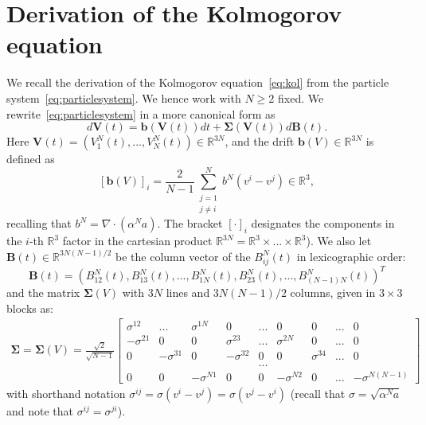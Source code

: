 \documentclass[11pt,a4paper]{article}
\theoremstyle{definition}
\theoremstyle{plain}
\newcommand{\bd}[1]{\mathbf{#1}}
\begin{document}
\section{Derivation of the Kolmogorov equation}
\label{sec:derivkol}
We recall the derivation of the Kolmogorov equation~\eqref{eq:kol} from the particle system~\eqref{eq:particlesystem}. We hence work with $N\geq 2$ fixed.
We rewrite~\eqref{eq:particlesystem} in a more canonical form as
\begin{equation}
\label{eq:particlesystemappendix}
    d\bd{V}(t) = \bd{b}(\bd{V}(t)) dt + \bd{\Sigma}(\bd{V}(t)) d\bd{B}(t).
\end{equation}
Here $\bd{V}(t)=(V^N_1(t),...,V^N_N(t))\in\mathbb{R}^{3N}$, and the drift $\bd{b}(V)\in\mathbb{R}^{3N}$ is defined as
$$\left[\bd{b}(V)\right]_i=\frac{2}{N-1}\sum_{\substack{j=1\\ j\neq i}}^N b^N(v^i - v^j) \in \mathbb{R}^3,$$
recalling that $b^N=\nabla\cdot(\alpha^N a)$. The bracket $[\cdot]_i$ designates the components in the $i$-th $\mathbb{R}^3$ factor in the cartesian product $\mathbb{R}^{3N}=\mathbb{R}^3\times...\times\mathbb{R}^3$).
We also let $\bd{B}(t) \in \mathbb{R}^{3N(N-1)/2}$ be the column vector of the $B^N_{ij}(t)$ in lexicographic order:
$$\bd{B}(t)=(B^N_{12}(t),B^N_{13}(t),...,B^N_{1N}(t),B^N_{23}(t),...,B^N_{(N-1)N}(t))^T$$
and the matrix $\bd{\Sigma}(V)$ with $3N$ lines and $3N(N-1)/2$ columns, given in $3\times3$ blocks as:
\begin{align*}
    \bd{\Sigma} = \bd{\Sigma}(V) = \frac{\sqrt{2}}{\sqrt{N-1}}
    \left[\begin{array}{ccccccccc}
   \sigma^{12}  & ... & \sigma^{1N} & 0 & ... & 0 & 0 & ... & 0\\
   -\sigma^{21} & 0 &  0 & \sigma^{23} &...&\sigma^{2N} & 0 &...& 0 \\
   0 & -\sigma^{31} & 0 & -\sigma^{32} & 0 & 0 & \sigma^{34} & ... & 0 \\
   & & & & ... \\
   0 & 0 & -\sigma^{N1} & 0 & 0 & -\sigma^{N2} &  0 & ... & -\sigma^{N(N-1)}
\end{array}\right]
\end{align*}
with shorthand notation $\sigma^{ij}=\sigma(v^i-v^j)=\sigma(v^j-v^i)$ (recall that $\sigma= \sqrt{\alpha^N a}$ and note that $\sigma^{ij}=\sigma^{ji}$).
\end{document}
